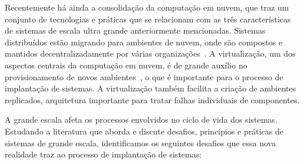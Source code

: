 Recentemente há ainda a consolidação da computação em nuvem, que traz um conjunto de tecnologias e práticas que se relacionam com as três características de sistemas de escala ultra grande anteriormente mencionadas. Sistemas distribuídos estão migrando para ambientes de nuvem, onde são compostos e mantidos decentralizadamente por várias organizações~\cite{Steen2011VeryLarge}. A virtualização, um dos aspectos centrais da computação em nuvem, é de grande auxílio no provisionamento de novos ambientes~\cite{Humble2011Continuous}, o que é importante para o processo de implantação de sistemas. A virtualização também facilita a criação de ambientes replicados, arquitetura importante para tratar falhas individuais de componentes.

A grande escala afeta os processos envolvidos no ciclo de vida dos sistemas.
Estudando a literatura que aborda e discute desafios, princípios e práticas de
sistemas de grande escala, identificamos os seguintes desafios que essa nova
realidade traz ao processo de implantação de sistemas:


